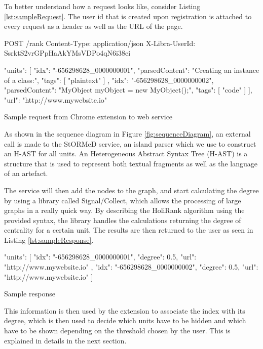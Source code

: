 To better understand how a request looks like, consider Listing \ref{lst:sampleRequest}. The user id that is created upon registration is attached to every request as a header as well as the URL of the page. 
\begin{listing}[H]
\centering	
\begin{jsoncode}
POST /rank
Content-Type: application/json
X-Libra-UserId: SsrktS2vrGPpHaAkYMsVDPo4qN6i38ei

{
  "units": [
    {
      "idx": "-656298628_0000000001",
      "parsedContent": "Creating an instance of a class:",
      "tags": [
        "plaintext"
      ]
    },
    {
      "idx": "-656298628_0000000002",
      "parsedContent": "MyObject myObject = new MyObject();",
      "tags": [
        "code"
      ]
    }
  ],
  "url": "http://www.mywebsite.io"
}
\end{jsoncode}
\caption{Sample request from Chrome extension to web service}
\label{lst:sampleRequest}
\end{listing}

As shown in the sequence diagram in Figure \ref{fig:sequenceDiagram}, an external call is made to the StORMeD service, an island parser which we use to construct an H-AST for all units. An Heterogeneous Abstract Syntax Tree (H-AST)\cite{Ponz2017a} is a structure that is used to represent both textual fragments as well as the language of an artefact. 

The service will then add the nodes to the graph, and start calculating the degree by using a library called Signal/Collect\cite{Stutz:2010:SGA:1940281.1940330}, which allows the processing of large graphs in a really quick way. By describing the HoliRank algorithm using the provided syntax, the library handles the calculations returning the degree of centrality for a certain unit. The results are then returned to the user as seen in Listing \ref{lst:sampleResponse}.

\begin{listing}[H]
\centering	
\begin{jsoncode}
{
  "units": [
    {
      "idx": "-656298628_0000000001",
      "degree": 0.5,
      "url": "http://www.mywebsite.io"
    },
    {
      "idx": "-656298628_0000000002",
      "degree": 0.5,
      "url": "http://www.mywebsite.io"
    }
  ]
}
\end{jsoncode}
\caption{Sample response}
\label{lst:sampleResponse}
\end{listing}

This information is then used by the extension to associate the index with its degree, which is then used to decide which units have to be hidden and which have to be shown depending on the threshold chosen by the user. This is explained in details in the next section.

